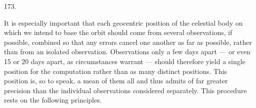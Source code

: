 \par{}\medskip
\begin{center}\hypertarget{native-243-article173}{}173.\end{center}
It is especially important that each geocentric position of the celestial body on which we intend to base the orbit should come from several observations, if possible, combined so that any errors cancel one another as far as possible, rather than from an isolated observation. Observations only a few days apart --- or even 15 or 20 days apart, as circumstances warrant --- should therefore yield a single position for the computation rather than as many distinct positions. This position is, so to speak, a mean of them all and thus admits of far greater precision than the individual observations considered separately. This procedure rests on the following principles.

